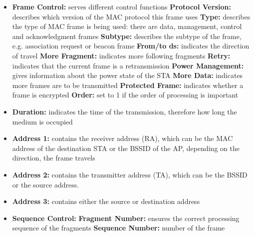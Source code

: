 \begin{itemize}
    \item \textbf{Frame Control:} serves different control functions
        \subitem \textbf{Protocol Version:} describes which version of the MAC protocol this frame uses
        \subitem \textbf{Type:} describes the type of MAC frame is being used: there are data, management, control and acknowledgment frames
        \subitem \textbf{Subtype:} describes the subtype of the frame, e.g. association request or beacon frame
        \subitem \textbf{From/to ds:} indicates the direction of travel
        \subitem \textbf{More Fragment:} indicates more following fragments
        \subitem \textbf{Retry:} indicates that the current frame is a retransmission
        \subitem \textbf{Power Management:} gives information about the power state of the STA
        \subitem \textbf{More Data:} indicates more frames are to be transmitted 
        \subitem \textbf{Protected Frame:} indicates whether a frame is encrypted
        \subitem \textbf{Order:} set to 1 if the order of processing is important
    \item \textbf{Duration:} indicates the time of the transmission, therefore how long the medium is occupied
    \item \textbf{Address 1:} contains the receiver address (RA), which can be the MAC address of the destination STA or the BSSID of the AP, depending on the direction, the frame travels
    \item \textbf{Address 2:} contains the transmitter address (TA), which can be the BSSID or the source address.
    \item \textbf{Address 3:} contains either the source or destination address
    \item \textbf{Sequence Control:}
        \subitem \textbf{Fragment Number:} ensures the correct processing sequence of the fragments
        \subitem \textbf{Sequence Number:} number of the frame
\end{itemize} 

